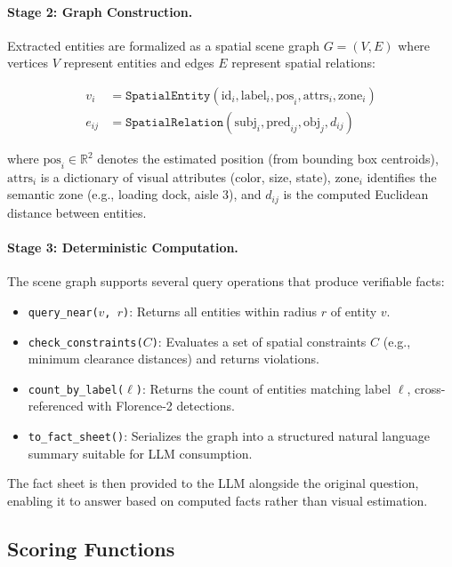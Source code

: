 \documentclass[11pt]{article}
\begin{document}
\paragraph{Stage 2: Graph Construction.}
Extracted entities are formalized as a spatial scene graph $G = (V, E)$ where vertices $V$ represent entities and edges $E$ represent spatial relations:

\begin{align}
  v_i &= \texttt{SpatialEntity}(\text{id}_i, \text{label}_i, \text{pos}_i, \text{attrs}_i, \text{zone}_i) \label{eq:entity} \\
  e_{ij} &= \texttt{SpatialRelation}(\text{subj}_i, \text{pred}_{ij}, \text{obj}_j, d_{ij}) \label{eq:relation}
\end{align}

where $\text{pos}_i \in \mathbb{R}^2$ denotes the estimated position (from bounding box centroids), $\text{attrs}_i$ is a dictionary of visual attributes (color, size, state), $\text{zone}_i$ identifies the semantic zone (e.g., loading dock, aisle 3), and $d_{ij}$ is the computed Euclidean distance between entities.

\paragraph{Stage 3: Deterministic Computation.}
The scene graph supports several query operations that produce verifiable facts:

\begin{itemize}[leftmargin=*,itemsep=1pt]
  \item \texttt{query\_near($v$, $r$)}: Returns all entities within radius $r$ of entity $v$.
  \item \texttt{check\_constraints($C$)}: Evaluates a set of spatial constraints $C$ (e.g., minimum clearance distances) and returns violations.
  \item \texttt{count\_by\_label($\ell$)}: Returns the count of entities matching label $\ell$, cross-referenced with Florence-2 detections.
  \item \texttt{to\_fact\_sheet()}: Serializes the graph into a structured natural language summary suitable for LLM consumption.
\end{itemize}

The fact sheet is then provided to the LLM alongside the original question, enabling it to answer based on computed facts rather than visual estimation.

\subsection{Scoring Functions}
\end{document}
